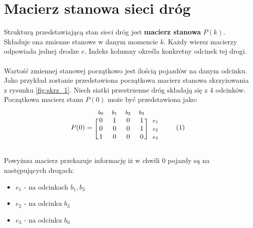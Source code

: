 \documentclass[12pt]{book}
\newcommand\addtag{\refstepcounter{equation}
\renewcommand{\labelenumii}{\theenumii}
\renewcommand{\theenumii}{\theenumi.\arabic{enumii}.}
\tag{\theequation}}
\begin{document}
\section{Macierz stanowa sieci dróg}
Strukturą przedstawiającą stan sieci dróg jest \textbf{macierz stanowa} $P(k)$. Składuje ona zmienne stanowe w danym momencie $k$. Każdy wiersz macierzy odpowiada jednej drodze $e$. Indeks kolumny określa konkretny odcinek tej drogi. \\ \\ Wartość zmiennej stanowej początkowo jest ilością pojazdów na danym odcinku.
Jako przykład zostanie przedstawiona początkowa macierz stanowa skrzyżowania z rysunku \ref{fig:skrz_1}. Niech siatki przestrzenne dróg składają się z 4 odcinków. Początkowa macierz stanu $P(0)$ może być przedstawiona jako:
\begin{equation*}
  P(0)=
  \begin{blockarray}{*{4}{c} l}
    \begin{block}{*{4}{>{$\footnotesize}c<{$}} l}
      $b_0$ & $b_1$ & $b_2$ & $b_3$ \\
    \end{block}
    \begin{block}{[*{4}{c}]>{$\footnotesize}l<{$}}
       0 & 1 & 0 & 1 & $e_1$ \\
       0 & 0 & 0 & 1 & $e_2$ \\
       1 & 0 & 0 & 0 & $e_3$ \\
    \end{block}
  \end{blockarray} \addtag \label{skrz_1_x0}
\end{equation*}


Powyższa macierz przekazuje informację iż w chwili $0$ pojazdy są na następujących drogach:
\begin{itemize}
\item $e_1$ - na odcinkach $b_1,b_3$ 
\item $e_2$ - na odcinku $b_3$ 
\item $e_3$ - na odcinku $b_0$ 
\end{itemize}
\end{document}
